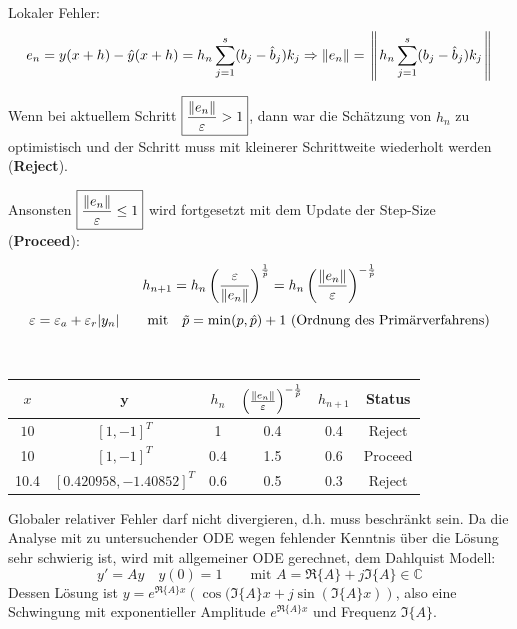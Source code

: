        Lokaler Fehler:
        $$e_n = y(x+h) - \hat{y}(x+h) = h_n \sum\limits_{j=1}^s (b_j - \hat{b}_j)k_j \Rightarrow 
        \Arrowvert e_n \Arrowvert = \left\Arrowvert h_n \sum\limits_{j=1}^s (b_j - \hat{b}_j)k_j \right\Arrowvert$$
          
        
        \begin{minipage}{7.5cm}
          Wenn bei aktuellem Schritt $\boxed{\frac{\Arrowvert e_n \Arrowvert}{\varepsilon} > 1}$, dann war die
          Schätzung von $h_n$ zu optimistisch und der Schritt muss mit kleinerer Schrittweite wiederholt
          werden (\textbf{Reject}). 
          
          Ansonsten $\boxed{\frac{\Arrowvert e_n \Arrowvert}{\varepsilon} \leq 1}$ wird fortgesetzt mit dem Update der Step-Size (\textbf{Proceed}): 
          
          $$h_{n+1} = h_n \left( \frac{\varepsilon}{\Arrowvert e_n \Arrowvert} \right)^{\frac{1}{\tilde{p}}}= 
          h_n \left( \frac{\Arrowvert e_n \Arrowvert}{\varepsilon} \right)^{-\frac{1}{\tilde{p}}}$$
          $$\varepsilon=\varepsilon_a+\varepsilon_r|y_n|
           \text{\qquad mit\quad} \tilde{p} = \min(p, \hat{p})+1 \text{ (Ordnung des Primärverfahrens)}$$
        \end{minipage}
        \hspace{0.5cm}
        \begin{minipage}{10.5cm}
          \\
          \begin{tabular}{cccccc}
            \hline
            $x$ & $\bm y$ & $h_n$ & $\left( \frac{\Arrowvert e_n \Arrowvert}{\varepsilon} \right)^{-\frac{1}{\tilde{p}}}$ & $h_{n+1}$ & Status \\
            \hline
            $10$ & $[1, -1]^T$ & 1 & 0.4 & 0.4 & Reject\\
            10 & $[1,-1]^T$ & 0.4 & 1.5 & 0.6 & Proceed\\
            10.4 & $[0.420958, -1.40852]^T$ & 0.6 & 0.5 & 0.3 & Reject\\
            \hline
          \end{tabular}
        \end{minipage}
        
        
        
      Globaler relativer Fehler darf nicht divergieren, d.h. muss beschränkt sein. 
      Da die Analyse mit zu untersuchender ODE wegen fehlender Kenntnis über die Lösung sehr schwierig
      ist, wird mit allgemeiner ODE gerechnet, dem Dahlquist Modell: 
      $$y' = A y \quad y(0) = 1 \qquad \text{mit } A = \Re\{A\} + j \Im\{A\} \in \mathbb{C}$$
      Dessen Lösung ist $y = e^{\Re\{A\} x} \left( \cos(\Im\{A\}x + j \sin(\Im\{A\} x) \right)$, also 
      eine Schwingung mit exponentieller Amplitude $e^{\Re\{A\} x}$ und Frequenz $\Im\{A\}$.
      
